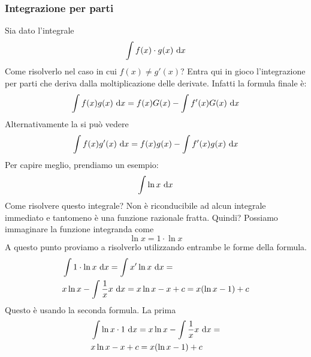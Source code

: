 \subsubsection{Integrazione per parti}
Sia dato l'integrale
\begin{equation*}
  \int f(x)\cdot g(x)\,\mathop{}\!\mathrm{d} x
\end{equation*}
Come risolverlo nel caso in cui $f(x)\neq g'(x)$? Entra qui in gioco l'integrazione per parti che
deriva dalla moltiplicazione delle derivate. Infatti la formula finale è:
\begin{equation*}
  \int f(x) g(x)\,\mathop{}\!\mathrm{d} x = f(x)G(x) - \int f'(x)G(x)\,\mathop{}\!\mathrm{d} x
\end{equation*}
Alternativamente la si può vedere
\begin{equation*}
  \int f(x) g'(x)\,\mathop{}\!\mathrm{d} x = f(x)g(x) - \int f'(x)g(x)\,\mathop{}\!\mathrm{d} x
\end{equation*}
Per capire meglio, prendiamo un esempio:
\begin{equation*}
  \int \ln x\,\mathop{}\!\mathrm{d} x
\end{equation*}
Come risolvere questo integrale? Non è riconducibile ad alcun integrale immediato e tantomeno è
una funzione razionale fratta. Quindi? Possiamo immaginare la funzione integranda come
\begin{equation*}
  \ln x = 1\cdot\ln x
\end{equation*}
A questo punto proviamo a risolverlo utilizzando entrambe le forme della formula.
\begin{align*}
  &\int 1\cdot\ln x\,\mathop{}\!\mathrm{d} x = \int x'\ln x\,\mathop{}\!\mathrm{d} x =\\
  &x\ln x - \int \frac{1}{x}x\,\mathop{}\!\mathrm{d} x =
  x\ln x-x+c = x(\ln x - 1)+c
\end{align*}
Questo è usando la seconda formula. La prima
\begin{align*}
  &\int \ln x\cdot 1\,\mathop{}\!\mathrm{d} x = x\ln x - \int \frac{1}{x}x\,\mathop{}\!\mathrm{d} x=\\
  &x\ln x - x+c = x(\ln x-1)+c
\end{align*}

